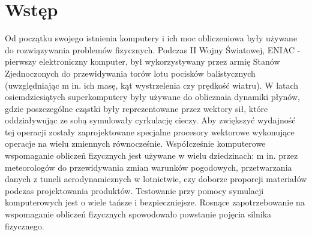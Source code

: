   \section{Wstęp}\label{sec:wstep}
Od początku swojego istnienia komputery i ich moc obliczeniowa były
używane do rozwiązywania problemów fizycznych. Podczas II Wojny Światowej, ENIAC
- pierwszy elektroniczny komputer, był wykorzystywany przez armię Stanów Zjednoczonych do
przewidywania torów lotu pocisków balistycznych (uwzględniając m in. ich masę,
kąt wystrzelenia czy prędkość wiatru). W latach osiemdziesiątych superkomputery
były używane do oblicznaia dynamiki płynów, gdzie poszczególne cząstki były
reprezentowane przez wektory sił, które oddziaływując ze sobą symulowały
cyrkulację cieczy. Aby zwiększyć wydajność tej operacji zostały zaprojektowane
specjalne procesory wektorowe wykonujące operacje na wielu zmiennych
równocześnie. Współcześnie komputerowe wspomaganie obliczeń fizycznych jest
używane w wielu dziedzinach: m in. przez meteorologów do przewidywania zmian
warunków pogodowych, przetwarzania danych z tuneli aerodynamicznych w
lotnictwie, czy doborze proporcji materiałów podczas projektowania produktów. Testowanie
przy pomocy symulacji komputerowych jest o wiele tańsze i bezpieczniejsze. Rosnące
zapotrzebowanie na wspomaganie obliczeń fizycznych spowodowało powstanie pojęcia
silnika fizycznego.
